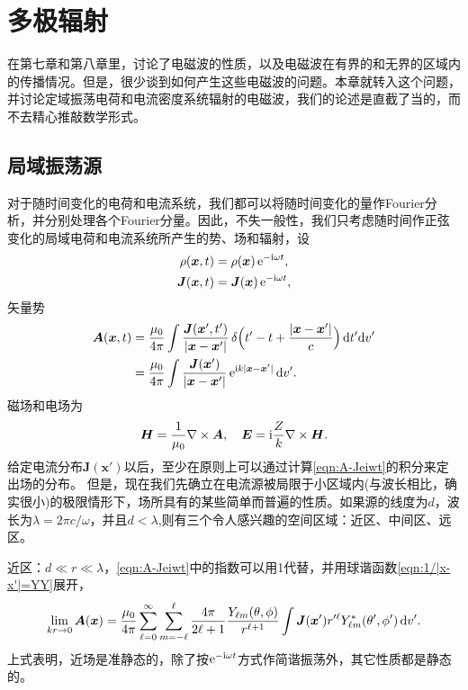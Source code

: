 \chapter{多极辐射}
\label{chap:multipole radiation}
在第七章和第八章里，讨论了电磁波的性质，以及电磁波在有界的和无界的区域内的传播情况。但是，很少谈到如何产生这些电磁波的问题。本章就转入这个问题，并讨论定域振荡电荷和电流密度系统辐射的电磁波，我们的论述是直截了当的，而不去精心推敲数学形式。%

\section{局域振荡源}
对于随时间变化的电荷和电流系统，我们都可以将随时间变化的量作Fourier分析，并分别处理各个Fourier分量。因此，不失一般性，我们只考虑随时间作正弦变化的局域电荷和电流系统所产生的势、场和辐射，设
\begin{align*}
    \rho(\bm x,t)&=\rho(\bm x)\mathop{}\!\mathrm{e}^{-\mathrm{i}\omega t},\\
    \bm J(\bm x,t)&=\bm J(\bm x)\mathop{}\!\mathrm{e}^{-\mathrm{i}\omega t},
\end{align*}
矢量势
\begin{align}
    \notag
    \bm A(\bm x,t)&=\frac{\mu_0}{4\pi}\int\frac{\bm J(\bm x',t')}{|\bm x-\bm x'|}\mathop{}\!\delta\Bigl(t'-t+\frac{|\bm x-\bm x'|}c\Bigr)\mathop{}\!\mathrm{d} t'\mathrm{d} v'\\
    \label{eqn:A-Jeiwt}
    &=\frac{\mu_0}{4\pi}\int\frac{\bm J(\bm x')}{|\bm x-\bm x'|}\mathop{}\!\mathrm{e}^{\mathrm{i} k|\bm x-\bm x'|}\mathop{}\!\mathrm{d} v'.
\end{align}
磁场和电场为
\[
    \bm H=\frac1{\mu_0}\nabla\times\bm A,\quad\bm E=\mathrm{i}\frac Zk\nabla\times\bm H.
\]
给定电流分布$\bm J(\bm x')$以后，至少在原则上可以通过计算\eqref{eqn:A-Jeiwt}的积分来定出场的分布。%
但是，现在我们先确立在电流源被局限于小区域内(与波长相比，确实很小)的极限情形下，场所具有的某些简单而普遍的性质。如果源的线度为$d$，波长为$\lambda=2\pi c/\omega$，并且$d<\lambda$,则有三个令人感兴趣的空间区域：近区、中间区、远区。

近区：$d\ll r\ll\lambda$，\eqref{eqn:A-Jeiwt}中的指数可以用1代替，并用球谐函数\eqref{eqn:1/|x-x'|=YY}展开，
\[
    \lim_{kr\to0}\bm A(\bm x)=\frac{\mu_0}{4\pi}\sum_{\ell=0}^\infty\sum_{m=-\ell}^\ell\frac{4\pi}{2\ell+1}\frac{Y_{\ell m}(\theta,\phi)}{r^{\ell+1}}\int\bm J(\bm x')r'^\ell Y^\ast_{\ell m}(\theta',\phi')\mathop{}\!\mathrm{d} v'.
\]
上式表明，近场是准静态的，除了按$\mathop{}\!\mathrm{e}^{-\mathrm{i}\omega t}$方式作简谐振荡外，其它性质都是静态的。


